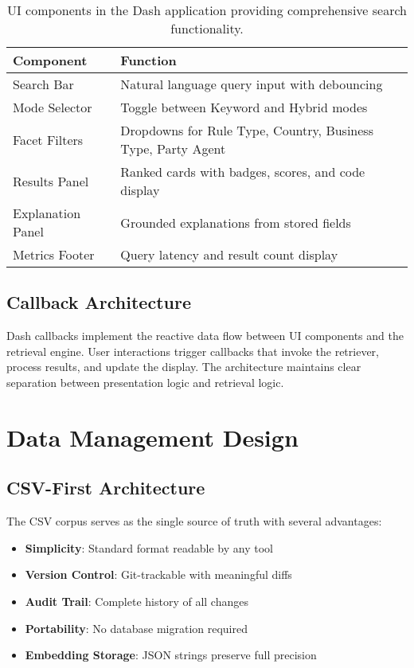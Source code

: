 \begin{table}[ht]
\centering
\begin{tabular}{ll}
\toprule
\textbf{Component} & \textbf{Function} \\
\midrule
Search Bar & Natural language query input with debouncing \\
Mode Selector & Toggle between Keyword and Hybrid modes \\
Facet Filters & Dropdowns for Rule Type, Country, Business Type, Party Agent \\
Results Panel & Ranked cards with badges, scores, and code display \\
Explanation Panel & Grounded explanations from stored fields \\
Metrics Footer & Query latency and result count display \\
\bottomrule
\end{tabular}
\caption{UI components in the Dash application providing comprehensive search functionality.}
\label{tab:ui-components}
\end{table}

\subsection{Callback Architecture}

Dash callbacks implement the reactive data flow between UI components and the retrieval engine. User interactions trigger callbacks that invoke the retriever, process results, and update the display. The architecture maintains clear separation between presentation logic and retrieval logic.

\section{Data Management Design}

\subsection{CSV-First Architecture}

The CSV corpus serves as the single source of truth with several advantages:

\begin{itemize}[leftmargin=*,itemsep=2pt,topsep=2pt]
  \item \textbf{Simplicity}: Standard format readable by any tool
  \item \textbf{Version Control}: Git-trackable with meaningful diffs
  \item \textbf{Audit Trail}: Complete history of all changes
  \item \textbf{Portability}: No database migration required
  \item \textbf{Embedding Storage}: JSON strings preserve full precision
\end{itemize}


